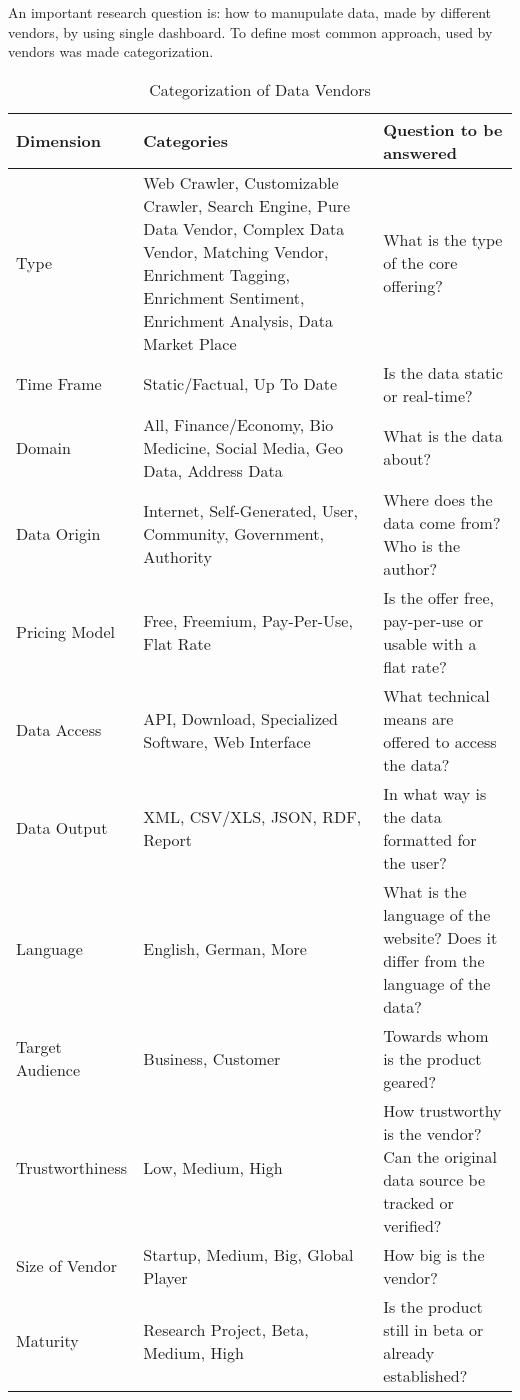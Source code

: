 	An important research question is: how to manupulate data, made by different vendors, by using single dashboard. To define most common approach, used by vendors was made categorization\cite{schomm2013marketplaces}.
	\begin{table}[H]
	\centering
	\begin{tabular}{|L{2cm}|L{7cm}|L{6cm}|}
	\hline
	\textbf{Dimension} 			& \textbf{Categories} & \textbf{Question to be answered} \\
	\hline
	\hline 
	Type		                & Web Crawler, Customizable Crawler, Search Engine, Pure Data Vendor, Complex Data Vendor, Matching 
	                                   Vendor, Enrichment Tagging, Enrichment Sentiment, Enrichment Analysis, Data Market Place & What is the type of the core offering?  \\
	\hline
	Time Frame	                & Static/Factual, Up To Date & Is the data static or real-time?  \\
	\hline
	Domain		                & All, Finance/Economy, Bio Medicine, Social Media, Geo Data, Address Data & What is the data about?  \\
	\hline
	Data Origin                 & Internet, Self-Generated, User, Community, Government, Authority & Where does the data come 
	                                       from?Who is the author?  \\
	\hline
	Pricing Model		        & Free, Freemium, Pay-Per-Use, Flat Rate & Is the offer free, pay-per-use or usable with a flat rate? \\
	\hline
	Data Access		            & API, Download, Specialized Software, Web Interface & What technical means are offered to access the data? \\
	\hline
	Data Output		            & XML, CSV/XLS, JSON, RDF, Report& In what way is the data formatted for the user?  \\
	\hline
	Language 		            & English, German, More & What is the language of the website? Does it differ from the language of the 
	                                data? \\
	\hline 
	Target Audience		        & Business, Customer & Towards whom is the product geared?  \\
	\hline
	Trustworthiness	            & Low, Medium, High & How trustworthy is the vendor? Can the original data source be tracked or 
	                                 verified?  \\
	\hline 		
	Size of Vendor 		        & Startup, Medium, Big, Global Player & How big is the vendor?  \\
	\hline 
     Maturity                   & Research Project, Beta, Medium, High & Is the product still in beta or already established? \\
	\hline 
	\end{tabular}
	\caption[Categorization of Data Vendors]{Categorization of Data Vendors}
	\label{tab:categorization}
	\end{table}

